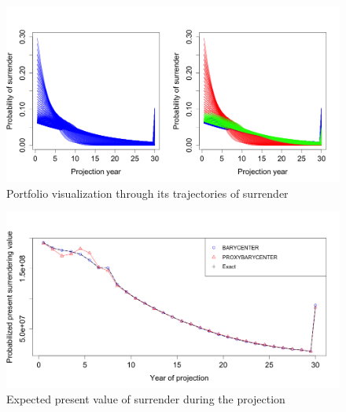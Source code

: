 \begin{center}
	\begin{figure}[ht!]
		\begin{center}
			\includegraphics[width=15cm]{Chapitre6/TrajectoriesClassified.png}
			\caption{Portfolio visualization through its trajectories of surrender}
			\label{ClassifiedPTF}
		\end{center}
	\end{figure}
\end{center}
\begin{center}
	\begin{figure}[ht!]
		\begin{center}
			\includegraphics[width=15cm]{Chapitre6/VapChronical.png}
			\caption{Expected present value of surrender during the projection}
			\label{VAPChronical}
		\end{center}
	\end{figure}
\end{center}
